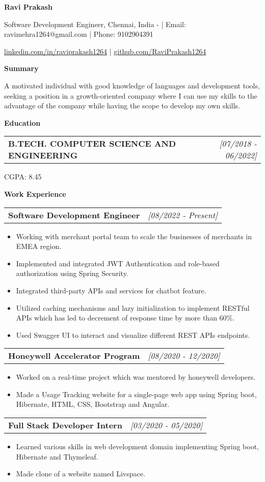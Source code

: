 \documentclass[a4paper,10pt]{article}
\makeatletter
\newcommand{\resitem}[1]{\item #1}
\newcommand{\resheading}[1]{\vspace{0.5em} {\small \colorbox{mygrey}{{\begin{minipage}{0.975\textwidth}{{\textbf{#1}}}\end{minipage}}}} \vspace{0.5em}}
\newcommand{\ressubheading}[3]{\begin{tabular*}{6.62in}{l @{\extracolsep{\fill}} r} \textbf{#1} & \textit{[#2]} \\ \end{tabular*}\vspace{-8pt}}
\makeatother
\begin{document}
\begin{center} \Large{\textbf{Ravi Prakash}} \end{center}

\vspace{2pt}

\begin{center} Software Development Engineer, Chennai, India - | Email: ravimehra1264@gmail.com | Phone: 9102904391 \end{center}
\begin{center} \href{linkedin.com/in/raviprakash1264}{linkedin.com/in/raviprakash1264} | \href{github.com/RaviPrakash1264}{github.com/RaviPrakash1264} \end{center}

\vspace{0.5em}
\resheading{Summary}
\resitem{A motivated individual with good knowledge of languages and development tools, seeking a position in a growth-oriented company where I can use my skills to the advantage of the company while having the scope to develop my own skills.}

\resheading{Education}
\ressubheading{B.TECH. COMPUTER SCIENCE AND ENGINEERING}{07/2018 - 06/2022}{VIT Univeristy, Vellore}
\resitem{CGPA: 8.45}

\resheading{Work Experience}
\ressubheading{Software Development Engineer}{08/2022 - Present}{Fiserv, Chennai}
\begin{itemize}[nosep]
    \resitem{Working with merchant portal team to scale the businesses of merchants in EMEA region.}
    \resitem{Implemented and integrated JWT Authentication and role-based authorization using Spring Security.}
    \resitem{Integrated third-party APIs and services for chatbot feature.}
    \resitem{Utilized caching mechanisms and lazy initialization to implement RESTful APIs which has led to decrement of response time by more than 60\%.}
    \resitem{Used Swagger UI to interact and visualize different REST APIs endpoints.}
\end{itemize}
\ressubheading{Honeywell Accelerator Program}{08/2020 - 12/2020}{Honeywell, Remote}
\begin{itemize}[nosep]
    \resitem{Worked on a real-time project which was mentored by honeywell developers.}
    \resitem{Made a Usage Tracking website for a single-page web app using Spring boot, Hibernate, HTML, CSS, Bootstrap and Angular.}
\end{itemize}
\ressubheading{Full Stack Developer Intern}{03/2020 - 05/2020}{Foxmula, Remote}
\begin{itemize}[nosep]
    \resitem{Learned various skills in web development domain implementing Spring boot, Hibernate and Thymeleaf.}
    \resitem{Made clone of a website named Livspace.}
\end{itemize}
\end{document}
